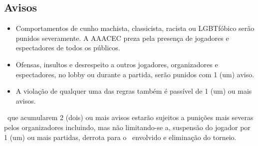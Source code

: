 \subsection{Avisos}

\begin{itemize}
    \item Comportamentos de cunho machista, classicista, racista ou LGBTfóbico serão punidos severamente. A AAACEC preza pela presença de jogadores e espectadores de todos os públicos.
    \item Ofensas, insultos e desrespeito a outros jogadores, organizadores e espectadores, no lobby ou durante a partida, serão punidos com 1 (um) aviso.
    \item A violação de qualquer uma das regras também é passível de 1 (um) ou mais avisos.
\end{itemize}

\CapBasicUnitPl\ que acumularem 2 (dois) ou mais avisos estarão sujeitos a punições mais severas pelos organizadores incluindo, mas não limitando-se a, suspensão do jogador por 1 (um) ou mais partidas, derrota para o \BasicUnit\ envolvido e eliminação do torneio.